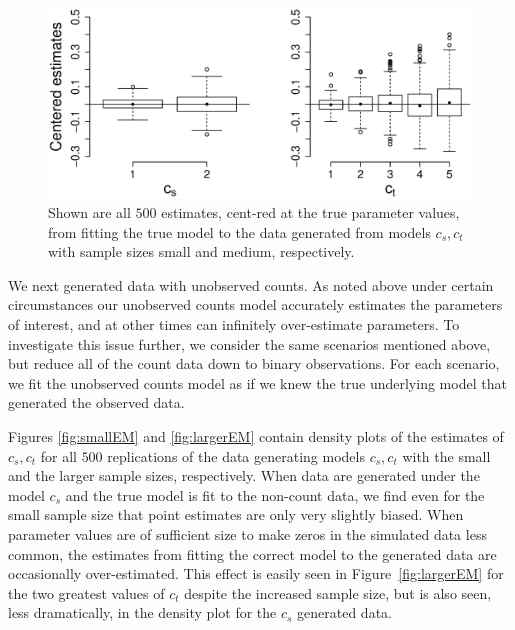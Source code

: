 \documentclass[smallextended]{svjour3}
\begin{document}
\begin{figure}
  \centering
  \includegraphics[scale=0.5]{bp}
  \caption{Shown are all $500$ estimates, cent-red at the true parameter values, from fitting the true model to the data generated from models $c_s,c_t$ with sample sizes small and medium, respectively.}
  \label{fig:bp}
\end{figure}

We next generated data with unobserved counts.  As noted above under certain circumstances our unobserved counts model accurately estimates the parameters of interest, and at other times can infinitely over-estimate parameters.  To investigate this issue further, we consider the same scenarios mentioned above, but reduce all of the count data down to binary observations.  For each scenario, we fit the unobserved counts model as if we knew the true underlying model that generated the observed data.

Figures \ref{fig:smallEM} and \ref{fig:largerEM} contain density plots of the estimates of $c_s, c_t$ for all $500$ replications of the data generating models $c_s,c_t$ with the small and the larger sample sizes, respectively.  When data are generated under the model $c_s$ and the true model is fit to the non-count data, we find even for the small sample size that point estimates are only very slightly biased.  When parameter values are of sufficient size to make zeros in the simulated data less common, the estimates from fitting the correct model to the generated data are occasionally over-estimated.  This effect is easily seen in Figure~\ref{fig:largerEM} for the two greatest values of $c_t$ despite the increased sample size, but is also seen, less dramatically, in the density plot for the $c_s$ generated data.  
\end{document}
